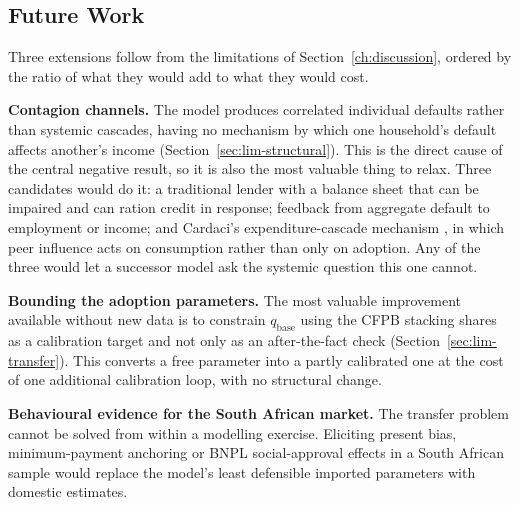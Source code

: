
\subsection{Future Work}
\label{sec:future-work}

Three extensions follow from the limitations of Section~\ref{ch:discussion}, ordered by the ratio
of what they would add to what they would cost.

\textbf{Contagion channels.} The model produces correlated individual defaults rather than systemic
cascades, having no mechanism by which one household's default affects another's income
(Section~\ref{sec:lim-structural}). This is the direct cause of the central negative result, so it
is also the most valuable thing to relax. Three candidates would do it: a traditional lender with a
balance sheet that can be impaired and can ration credit in response; feedback from aggregate
default to employment or income; and Cardaci's expenditure-cascade mechanism
\cite{cardaci2018inequality}, in which peer influence acts on consumption rather than only on
adoption. Any of the three would let a successor model ask the systemic question this one cannot.

\textbf{Bounding the adoption parameters.} The most valuable improvement available without new data
is to constrain $q_{\text{base}}$ using the \ac{CFPB} stacking shares as a calibration target and
not only as an after-the-fact check (Section~\ref{sec:lim-transfer}). This converts a free
parameter into a partly calibrated one at the cost of one additional calibration loop, with no
structural change.

\textbf{Behavioural evidence for the South African market.} The transfer problem cannot be solved
from within a modelling exercise. Eliciting present bias, minimum-payment anchoring or \ac{BNPL}
social-approval effects in a South African sample would replace the model's least defensible
imported parameters with domestic estimates.


